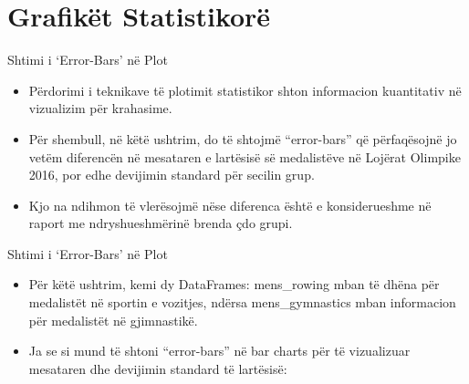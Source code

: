 \documentclass[
  ignorenonframetext,
]{beamer}
\begin{document}
\hypertarget{grafikuxebt-statistikoruxeb}{%
\section{Grafikët Statistikorë}\label{grafikuxebt-statistikoruxeb}}

\begin{frame}{Shtimi i `Error-Bars' në Plot}
\protect\hypertarget{shtimi-i-error-bars-nuxeb-plot}{}
\begin{itemize}
\item
  Përdorimi i teknikave të plotimit statistikor shton informacion
  kuantitativ në vizualizim për krahasime.
\item
  Për shembull, në këtë ushtrim, do të shtojmë ``error-bars'' që
  përfaqësojnë jo vetëm diferencën në mesataren e lartësisë së
  medalistëve në Lojërat Olimpike 2016, por edhe devijimin standard për
  secilin grup.
\item
  Kjo na ndihmon të vlerësojmë nëse diferenca është e konsiderueshme në
  raport me ndryshueshmërinë brenda çdo grupi.
\end{itemize}
\end{frame}

\begin{frame}{Shtimi i `Error-Bars' në Plot}
\protect\hypertarget{shtimi-i-error-bars-nuxeb-plot-1}{}
\begin{itemize}
\item
  Për këtë ushtrim, kemi dy DataFrames: mens\_rowing mban të dhëna për
  medalistët në sportin e vozitjes, ndërsa mens\_gymnastics mban
  informacion për medalistët në gjimnastikë.
\item
  Ja se si mund të shtoni ``error-bars'' në bar charts për të
  vizualizuar mesataren dhe devijimin standard të lartësisë:
\end{itemize}
\end{frame}
\end{document}
